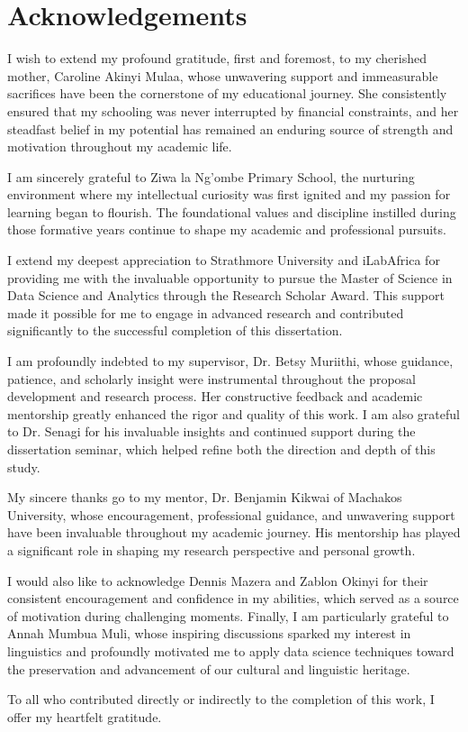 \chapter*{Acknowledgements}

I wish to extend my profound gratitude, first and foremost, to my cherished mother, Caroline Akinyi Mulaa, whose unwavering support and immeasurable sacrifices have been the cornerstone of my educational journey. She consistently ensured that my schooling was never interrupted by financial constraints, and her steadfast belief in my potential has remained an enduring source of strength and motivation throughout my academic life.

I am sincerely grateful to Ziwa la Ng’ombe Primary School, the nurturing environment where my intellectual curiosity was first ignited and my passion for learning began to flourish. The foundational values and discipline instilled during those formative years continue to shape my academic and professional pursuits.

I extend my deepest appreciation to Strathmore University and iLabAfrica for providing me with the invaluable opportunity to pursue the Master of Science in Data Science and Analytics through the Research Scholar Award. This support made it possible for me to engage in advanced research and contributed significantly to the successful completion of this dissertation.

I am profoundly indebted to my supervisor, Dr. Betsy Muriithi, whose guidance, patience, and scholarly insight were instrumental throughout the proposal development and research process. Her constructive feedback and academic mentorship greatly enhanced the rigor and quality of this work. I am also grateful to Dr. Senagi for his invaluable insights and continued support during the dissertation seminar, which helped refine both the direction and depth of this study.

My sincere thanks go to my mentor, Dr. Benjamin Kikwai of Machakos University, whose encouragement, professional guidance, and unwavering support have been invaluable throughout my academic journey. His mentorship has played a significant role in shaping my research perspective and personal growth.

I would also like to acknowledge Dennis Mazera and Zablon Okinyi for their consistent encouragement and confidence in my abilities, which served as a source of motivation during challenging moments. Finally, I am particularly grateful to Annah Mumbua Muli, whose inspiring discussions sparked my interest in linguistics and profoundly motivated me to apply data science techniques toward the preservation and advancement of our cultural and linguistic heritage.

To all who contributed directly or indirectly to the completion of this work, I offer my heartfelt gratitude.

